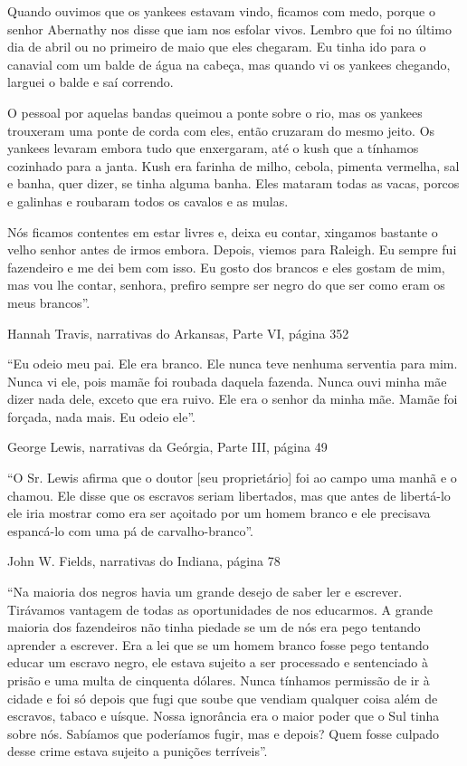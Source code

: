 Quando ouvimos que os yankees estavam vindo, ficamos com medo, porque o
senhor Abernathy nos disse que iam nos esfolar vivos. Lembro que foi no
último dia de abril ou no primeiro de maio que eles chegaram. Eu tinha
ido para o canavial com um balde de água na cabeça, mas quando vi os
yankees chegando, larguei o balde e saí correndo.

O pessoal por aquelas bandas queimou a ponte sobre o rio, mas os yankees
trouxeram uma ponte de corda com eles, então cruzaram do mesmo jeito. Os
yankees levaram embora tudo que enxergaram, até o kush que a tínhamos
cozinhado para a janta. Kush era farinha de milho, cebola, pimenta
vermelha, sal e banha, quer dizer, se tinha alguma banha. Eles mataram
todas as vacas, porcos e galinhas e roubaram todos os cavalos e as
mulas.

Nós ficamos contentes em estar livres e, deixa eu contar, xingamos
bastante o velho senhor antes de irmos embora. Depois, viemos para
Raleigh. Eu sempre fui fazendeiro e me dei bem com isso. Eu gosto dos
brancos e eles gostam de mim, mas vou lhe contar, senhora, prefiro
sempre ser negro do que ser como eram os meus brancos''.

Hannah Travis, narrativas do Arkansas, Parte VI, página 352

``Eu odeio meu pai. Ele era branco. Ele nunca teve nenhuma serventia
para mim. Nunca vi ele, pois mamãe foi roubada daquela fazenda. Nunca
ouvi minha mãe dizer nada dele, exceto que era ruivo. Ele era o senhor
da minha mãe. Mamãe foi forçada, nada mais. Eu odeio ele''.

George Lewis, narrativas da Geórgia, Parte III, página 49

``O Sr. Lewis afirma que o doutor {[}seu proprietário{]} foi ao campo
uma manhã e o chamou. Ele disse que os escravos seriam libertados, mas
que antes de libertá-lo ele iria mostrar como era ser açoitado por um
homem branco e ele precisava espancá-lo com uma pá de carvalho-branco''.

John W. Fields, narrativas do Indiana, página 78

``Na maioria dos negros havia um grande desejo de saber ler e escrever.
Tirávamos vantagem de todas as oportunidades de nos educarmos. A grande
maioria dos fazendeiros não tinha piedade se um de nós era pego tentando
aprender a escrever. Era a lei que se um homem branco fosse pego
tentando educar um escravo negro, ele estava sujeito a ser processado e
sentenciado à prisão e uma multa de cinquenta dólares. Nunca tínhamos
permissão de ir à cidade e foi só depois que fugi que soube que vendiam
qualquer coisa além de escravos, tabaco e uísque. Nossa ignorância era o
maior poder que o Sul tinha sobre nós. Sabíamos que poderíamos fugir,
mas e depois? Quem fosse culpado desse crime estava sujeito a punições
terríveis''.

